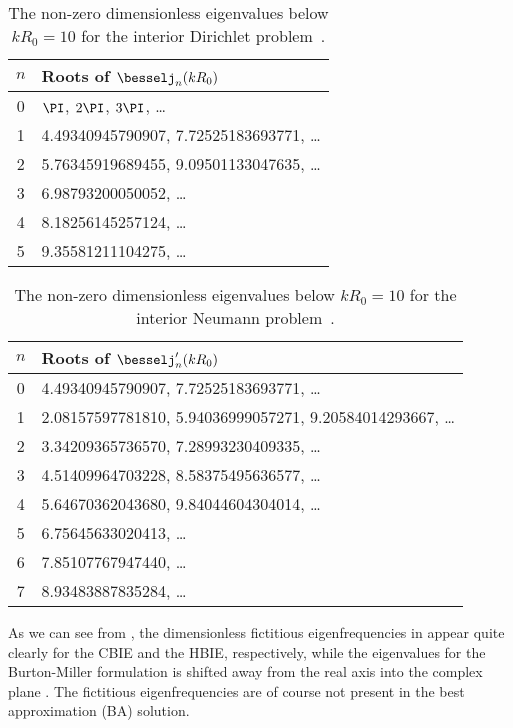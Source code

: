 \begin{table}
	\centering
	\caption{The non-zero dimensionless eigenvalues below $kR_0=10$ for the interior Dirichlet problem~\cite{Zheng2015itb}.}
	\label{Tab3:eigenFreqDirichlet}
	\begin{tabular}{c l}
		\toprule
		$n$ & Roots of $\besselj_n(kR_0)$ \\
		\hline
		0 & $\PI$, $2\PI$, $3\PI$, \dots \\
	    1 & 4.49340945790907, 7.72525183693771, \dots \\
	  	2 & 5.76345919689455, 9.09501133047635, \dots \\
	    3 & 6.98793200050052, \dots \\
	    4 & 8.18256145257124, \dots \\
	    5 & 9.35581211104275, \dots \\
		\bottomrule
	\end{tabular}
\end{table}
\begin{table}
	\centering
	\caption{The non-zero dimensionless eigenvalues below $kR_0=10$ for the interior Neumann problem~\cite{Zheng2015itb}.}
	\label{Tab3:eigenFreqNeumann}
	\begin{tabular}{c l}
		\toprule
		$n$ & Roots of $\besselj_n'(kR_0)$\\
		\hline
		0 & 4.49340945790907, 7.72525183693771, \dots \\
	    1 & 2.08157597781810, 5.94036999057271, 9.20584014293667, \dots \\
	  	2 & 3.34209365736570, 7.28993230409335, \dots \\
	    3 & 4.51409964703228, 8.58375495636577, \dots \\
	    4 & 5.64670362043680, 9.84044604304014, \dots \\
	    5 & 6.75645633020413, \dots \\
	    6 & 7.85107767947440, \dots \\
	    7 & 8.93483887835284, \dots \\
		\bottomrule
	\end{tabular}
\end{table}

As we can see from , the dimensionless fictitious eigenfrequencies in  appear quite clearly for the CBIE and the HBIE, respectively, while the eigenvalues for the Burton-Miller formulation is shifted away from the real axis into the complex plane \cite{Zheng2015itb}. The fictitious eigenfrequencies are of course not present in the best approximation (BA) solution.

